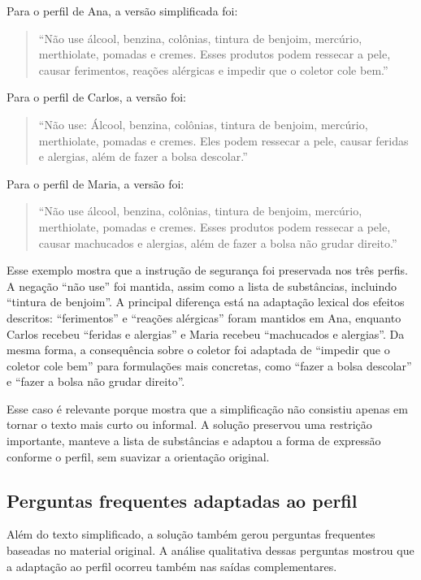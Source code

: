 Para o perfil de Ana, a versão simplificada foi:

\begin{quote}
``Não use álcool, benzina, colônias, tintura de benjoim, mercúrio, merthiolate, pomadas e cremes. Esses produtos podem ressecar a pele, causar ferimentos, reações alérgicas e impedir que o coletor cole bem.''
\end{quote}

Para o perfil de Carlos, a versão foi:

\begin{quote}
``Não use: Álcool, benzina, colônias, tintura de benjoim, mercúrio, merthiolate, pomadas e cremes. Eles podem ressecar a pele, causar feridas e alergias, além de fazer a bolsa descolar.''
\end{quote}

Para o perfil de Maria, a versão foi:

\begin{quote}
``Não use álcool, benzina, colônias, tintura de benjoim, mercúrio, merthiolate, pomadas e cremes. Esses produtos podem ressecar a pele, causar machucados e alergias, além de fazer a bolsa não grudar direito.''
\end{quote}

Esse exemplo mostra que a instrução de segurança foi preservada nos três perfis. A negação ``não use'' foi mantida, assim como a lista de substâncias, incluindo ``tintura de benjoim''. A principal diferença está na adaptação lexical dos efeitos descritos: ``ferimentos'' e ``reações alérgicas'' foram mantidos em Ana, enquanto Carlos recebeu ``feridas e alergias'' e Maria recebeu ``machucados e alergias''. Da mesma forma, a consequência sobre o coletor foi adaptada de ``impedir que o coletor cole bem'' para formulações mais concretas, como ``fazer a bolsa descolar'' e ``fazer a bolsa não grudar direito''.

Esse caso é relevante porque mostra que a simplificação não consistiu apenas em tornar o texto mais curto ou informal. A solução preservou uma restrição importante, manteve a lista de substâncias e adaptou a forma de expressão conforme o perfil, sem suavizar a orientação original.

\subsection{Perguntas frequentes adaptadas ao perfil}
\label{subsec:perguntas-frequentes-adaptadas-perfil}

Além do texto simplificado, a solução também gerou perguntas frequentes baseadas no material original. A análise qualitativa dessas perguntas mostrou que a adaptação ao perfil ocorreu também nas saídas complementares.


